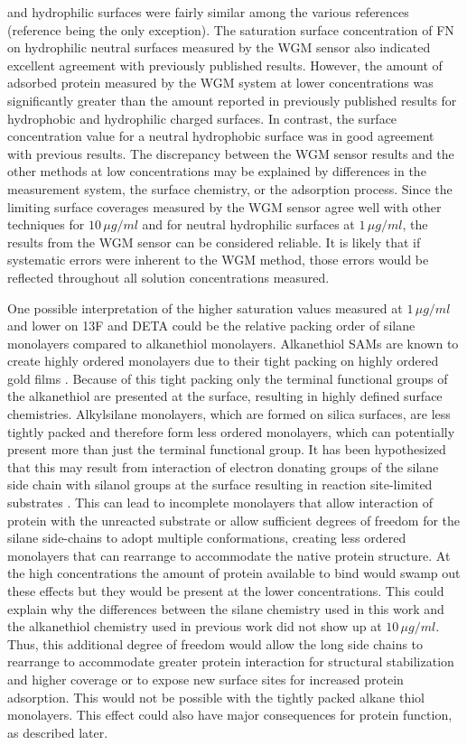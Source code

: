 and hydrophilic surfaces were fairly similar among the various references
(reference \cite{Lee2006} being the only exception). The saturation
surface concentration of FN on hydrophilic neutral surfaces measured
by the WGM sensor also indicated excellent agreement with previously
published results. However, the amount of adsorbed protein measured
by the WGM system at lower concentrations was significantly greater
than the amount reported in previously published results for hydrophobic
and hydrophilic charged surfaces. In contrast, the surface concentration
value for a neutral hydrophobic surface was in good agreement with
previous results. The discrepancy between the WGM sensor results and
the other methods at low concentrations may be explained by differences
in the measurement system, the surface chemistry, or the adsorption
process. Since the limiting surface coverages measured by the WGM
sensor agree well with other techniques for $10\,\mu g/ml$ and for
neutral hydrophilic surfaces at $1\,\mu g/ml$, the results from the
WGM sensor can be considered reliable. It is likely that if systematic
errors were inherent to the WGM method, those errors would be reflected
throughout all solution concentrations measured. 

One possible interpretation of the higher saturation values measured
at $1\,\mu g/ml$ and lower on 13F and DETA could be the relative
packing order of silane monolayers compared to alkanethiol monolayers.
Alkanethiol SAMs are known to create highly ordered monolayers due
to their tight packing on highly ordered gold films \cite{Prime1991}.
Because of this tight packing only the terminal functional groups
of the alkanethiol are presented at the surface, resulting in highly
defined surface chemistries. Alkylsilane monolayers, which are formed
on silica surfaces, are less tightly packed and therefore form less
ordered monolayers, which can potentially present more than just the
terminal functional group. It has been hypothesized that this may
result from interaction of electron donating groups of the silane
side chain with silanol groups at the surface resulting in reaction
site-limited substrates \cite{Stenger1992}. This can lead to incomplete
monolayers that allow interaction of protein with the unreacted substrate
or allow sufficient degrees of freedom for the silane side-chains
to adopt multiple conformations, creating less ordered monolayers
that can rearrange to accommodate the native protein structure. At
the high concentrations the amount of protein available to bind would
swamp out these effects but they would be present at the lower concentrations.
This could explain why the differences between the silane chemistry
used in this work and the alkanethiol chemistry used in previous work
\cite{Keselowsky2003} did not show up at $10\,\mu g/ml$. Thus, this
additional degree of freedom would allow the long side chains to rearrange
to accommodate greater protein interaction for structural stabilization
and higher coverage or to expose new surface sites for increased protein
adsorption. This would not be possible with the tightly packed alkane
thiol monolayers. This effect could also have major consequences for
protein function, as described later. 

